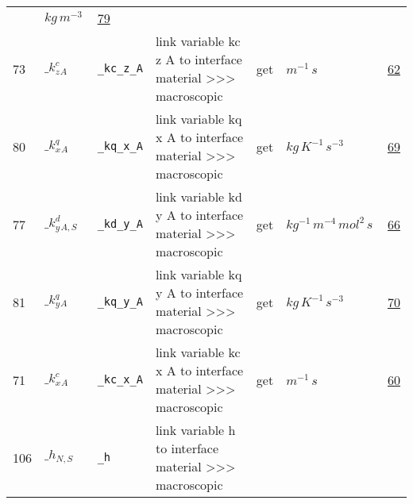 \begin{longtable}{|p{1cm}|p{2.5cm}|p{4.5cm}|p{8cm}|p{3.0cm}|p{3cm}|p{1cm}|}
             & $ kg \,m^{-3} \, $
             &                 \hyperlink{"e:79"}{ 79 }
                 \\
            73
             & \hypertarget{"v:73"}{ $ {{\_k^c_z}}{_{A}} $}
             & \verb|_kc_z_A|
             & link variable kc z A to interface material >>> macroscopic
             & \begin{lay}get \end{lay}
             & $ m^{-1} \,s \, $
             &                 \hyperlink{"e:62"}{ 62 }
                 \\
            80
             & \hypertarget{"v:80"}{ $ {{\_k^q_x}}{_{A}} $}
             & \verb|_kq_x_A|
             & link variable kq x A to interface material >>> macroscopic
             & \begin{lay}get \end{lay}
             & $ kg \,K^{-1} \,s^{-3} \, $
             &                 \hyperlink{"e:69"}{ 69 }
                 \\
            77
             & \hypertarget{"v:77"}{ $ {{\_k^d_y}}{_{A, S}} $}
             & \verb|_kd_y_A|
             & link variable kd y A to interface material >>> macroscopic
             & \begin{lay}get \end{lay}
             & $ kg^{-1} \,m^{-4} \,mol^{2} \,s \, $
             &                 \hyperlink{"e:66"}{ 66 }
                 \\
            81
             & \hypertarget{"v:81"}{ $ {{\_k^q_y}}{_{A}} $}
             & \verb|_kq_y_A|
             & link variable kq y A to interface material >>> macroscopic
             & \begin{lay}get \end{lay}
             & $ kg \,K^{-1} \,s^{-3} \, $
             &                 \hyperlink{"e:70"}{ 70 }
                 \\
            71
             & \hypertarget{"v:71"}{ $ {{\_k^c_x}}{_{A}} $}
             & \verb|_kc_x_A|
             & link variable kc x A to interface material >>> macroscopic
             & \begin{lay}get \end{lay}
             & $ m^{-1} \,s \, $
             &                 \hyperlink{"e:60"}{ 60 }
                 \\
            106
             & \hypertarget{"v:106"}{ $ {{\_h}}{_{N, S}} $}
             & \verb|_h|
             & link variable h to interface material >>> macroscopic

\end{longtable}
